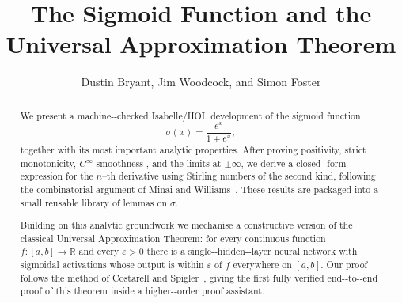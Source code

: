 \documentclass[11pt,a4paper]{article}
\begin{document}
\title{The Sigmoid Function and the Universal Approximation
Theorem}
\author{Dustin Bryant, Jim Woodcock, and Simon Foster}
\maketitle


\begin{abstract}
We present a machine-‑checked Isabelle/HOL development of the sigmoid
function
\[
  \sigma(x)=\frac{e^{x}}{1+e^{x}},
\]
together with its most important analytic properties.  After proving
positivity, strict monotonicity, \(C^{\infty}\) smoothness , and the
limits at \(\pm\infty\), we derive a closed-‑form expression for the
\(n\)--th derivative using Stirling numbers of the second kind, following
the combinatorial argument of Minai and Williams~\cite{MINAI1993845}.
These results are packaged into a small reusable library of lemmas on
\(\sigma\).

Building on this analytic groundwork we mechanise a constructive version
of the classical Universal Approximation Theorem: for every continuous
function \(f\colon[a,b]\to\mathbb{R}\) and every \(\varepsilon>0\) there
is a single-‑hidden-‑layer neural network with sigmoidal activations whose
output is within \(\varepsilon\) of \(f\) everywhere on \([a,b]\).  Our
proof follows the method of Costarell and Spigler~\cite{CostarelliSpigler},
giving the first fully verified end-‑to-‑end proof of this
theorem inside a higher-‑order proof assistant.
\end{abstract}



\tableofcontents



\nocite{*}



\end{document}
